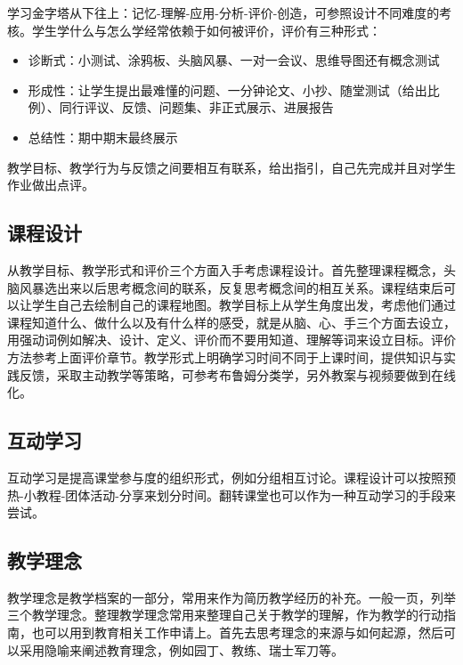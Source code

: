 \documentclass[]{tufte-book}
\providecommand{\tightlist}{%
  \setlength{\itemsep}{0pt}\setlength{\parskip}{0pt}}
\begin{document}
学习金字塔从下往上：记忆-理解-应用-分析-评价-创造，可参照设计不同难度的考核。学生学什么与怎么学经常依赖于如何被评价，评价有三种形式：

\begin{itemize}
\tightlist
\item
  诊断式：小测试、涂鸦板、头脑风暴、一对一会议、思维导图还有概念测试
\item
  形成性：让学生提出最难懂的问题、一分钟论文、小抄、随堂测试（给出比例）、同行评议、反馈、问题集、非正式展示、进展报告
\item
  总结性：期中期末最终展示
\end{itemize}

教学目标、教学行为与反馈之间要相互有联系，给出指引，自己先完成并且对学生作业做出点评。

\hypertarget{ux8bfeux7a0bux8bbeux8ba1}{%
\subsection{课程设计}\label{ux8bfeux7a0bux8bbeux8ba1}}

从教学目标、教学形式和评价三个方面入手考虑课程设计。首先整理课程概念，头脑风暴选出来以后思考概念间的联系，反复思考概念间的相互关系。课程结束后可以让学生自己去绘制自己的课程地图。教学目标上从学生角度出发，考虑他们通过课程知道什么、做什么以及有什么样的感受，就是从脑、心、手三个方面去设立，用强动词例如解决、设计、定义、评价而不要用知道、理解等词来设立目标。评价方法参考上面评价章节。教学形式上明确学习时间不同于上课时间，提供知识与实践反馈，采取主动教学等策略，可参考布鲁姆分类学，另外教案与视频要做到在线化。

\hypertarget{ux4e92ux52a8ux5b66ux4e60}{%
\subsection{互动学习}\label{ux4e92ux52a8ux5b66ux4e60}}

互动学习是提高课堂参与度的组织形式，例如分组相互讨论。课程设计可以按照预热-小教程-团体活动-分享来划分时间。翻转课堂也可以作为一种互动学习的手段来尝试。

\hypertarget{ux6559ux5b66ux7406ux5ff5}{%
\subsection{教学理念}\label{ux6559ux5b66ux7406ux5ff5}}

教学理念是教学档案的一部分，常用来作为简历教学经历的补充。一般一页，列举三个教学理念。整理教学理念常用来整理自己关于教学的理解，作为教学的行动指南，也可以用到教育相关工作申请上。首先去思考理念的来源与如何起源，然后可以采用隐喻来阐述教育理念，例如园丁、教练、瑞士军刀等。
\end{document}
